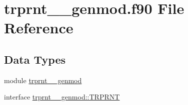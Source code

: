 \hypertarget{trprnt____genmod_8f90}{\section{trprnt\+\_\+\+\_\+genmod.\+f90 File Reference}
\label{trprnt____genmod_8f90}
}
\subsection*{Data Types}
\begin{DoxyCompactItemize}
\item 
module \hyperlink{classtrprnt____genmod}{trprnt\+\_\+\+\_\+genmod}
\item 
interface \hyperlink{interfacetrprnt____genmod_1_1TRPRNT}{trprnt\+\_\+\+\_\+genmod\+::\+T\+R\+P\+R\+N\+T}
\end{DoxyCompactItemize}
